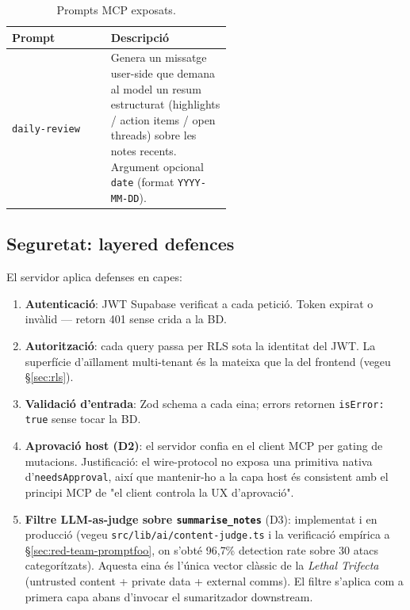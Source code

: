 \begin{table}[H]
    \centering
    \footnotesize
    \begin{tabular}{|l|p{0.55\linewidth}|}
        \hline
        \textbf{Prompt} & \textbf{Descripció} \\
        \hline
        \texttt{daily-review} &
            Genera un missatge user-side que demana al model un
            resum estructurat (highlights / action items / open
            threads) sobre les notes recents. Argument opcional
            \texttt{date} (format \texttt{YYYY-MM-DD}). \\
        \hline
    \end{tabular}
    \caption{Prompts MCP exposats.}
    \label{tab:mcp-prompts}
\end{table}

\subsection{Seguretat: layered defences}
\label{sec:mcp-seguretat}

El servidor aplica defenses en capes:

\begin{enumerate}
    \item \textbf{Autenticació}: JWT Supabase verificat a cada
        petició. Token expirat o invàlid --- retorn 401 sense
        crida a la BD.
    \item \textbf{Autorització}: cada query passa per RLS sota la
        identitat del JWT. La superfície d'aïllament multi-tenant
        és la mateixa que la del frontend (vegeu \S\ref{sec:rls}).
    \item \textbf{Validació d'entrada}: Zod schema a cada eina;
        errors retornen \texttt{isError: true} sense tocar la BD.
    \item \textbf{Aprovació host (D2)}: el servidor confia en el
        client MCP per gating de mutacions. Justificació: el
        wire-protocol no exposa una primitiva nativa
        d'\texttt{needsApproval}, així que mantenir-ho a la capa
        host és consistent amb el principi MCP de "el client
        controla la UX d'aprovació".
    \item \textbf{Filtre LLM-as-judge sobre \texttt{summarise\_notes}}
        (D3): implementat i en producció (vegeu
        \texttt{src/lib/ai/content-judge.ts} i la verificació empírica
        a \S\ref{sec:red-team-promptfoo}, on s'obté 96{,}7\% detection
        rate sobre 30 atacs categorítzats). Aquesta eina és l'única
        vector clàssic de la \textit{Lethal Trifecta} (untrusted
        content + private data + external comms). El filtre s'aplica
        com a primera capa abans d'invocar el sumaritzador
        downstream.
\end{enumerate}

